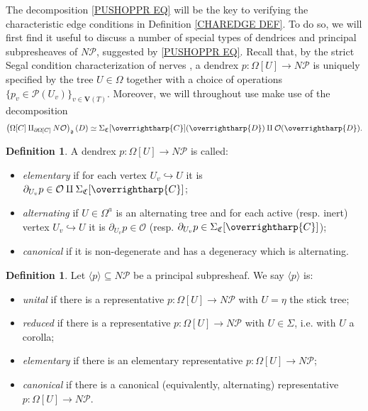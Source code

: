 \documentclass[a4paper,10pt]{article}%
\numberwithin{equation}{section}
\numberwithin{figure}{section}
\theoremstyle{definition} %
\newtheorem{definition}[equation]{Definition}%
\newcommand{\vect}[1]{\text{\overrightharp{\ensuremath{#1}}}}
\renewcommand{\O}{\ensuremath{\mathcal O}}
\newcommand{\1}{\ensuremath{\mathbbm 1}}%
\begin{document}
The decomposition \eqref{PUSHOPPR EQ}
will be the key to verifying the 
characteristic edge conditions in Definition \ref{CHAREDGE DEF}.
To do so, we will first find it useful to discuss a number of special types of dendrices and principal subpresheaves of $N \mathcal{P}$, suggested by \eqref{PUSHOPPR EQ}.
%
Recall that, by the strict Segal condition characterization of nerves \cite[Cor. 2.7]{CM13a},
a dendrex $p \colon \Omega[U] \to N \mathcal{P}$
is uniquely specified by the tree $U \in \Omega$ together with a choice of operations
$\{p_v \in \mathcal{P}(U_v)\}_{v \in \boldsymbol{V}(T)}$.
Moreover, we will throughout use make use of the decomposition 
\[
	\left(
	\Omega[C] \amalg_{\partial \Omega[C]} N \O
	\right)_{\mathfrak{d}} (D)
\simeq
	\Sigma_{\mathfrak{C}}[\vect{C}](\vect{D}) \amalg \O(\vect{D}).
\]


\begin{definition}
	A dendrex $p\colon \Omega[U] \to N \mathcal{P}$ 
	is called:
	\begin{itemize}
		\item \emph{elementary} if for each vertex $U_v \hookrightarrow U$
		it is $ \partial_{U_v} p \in \mathcal{O} \amalg \Sigma_{\mathfrak{C}}[\vect{C}]$; %
		\item \emph{alternating} if $U \in \Omega^a$ is an alternating tree
		and for each active (resp. inert) vertex 
		$U_v \hookrightarrow U$ it is
		$\partial_{U_v} p \in \O$
		(resp. $ \partial_{U_v} p \in \Sigma_{\mathfrak{C}}[\vect{C}]$);
		\item \emph{canonical} if it is non-degenerate and has a degeneracy which is alternating.
	\end{itemize}
\end{definition}


\begin{definition}
	Let $\langle p \rangle \subseteq N \mathcal{P}$ be 
	a principal subpresheaf. 
	We say $\langle p \rangle$ is:
	\begin{itemize}
		\item \emph{unital} if there is a representative
		$p\colon \Omega[U] \to N \mathcal{P}$ with $U=\eta$ the stick tree;
		\item \emph{reduced} if there is a representative
		$p\colon \Omega[U] \to N \mathcal{P}$ with $U \in \Sigma$, i.e. with $U$ a corolla;
		\item \emph{elementary} 
		if there is an elementary representative
		$p\colon \Omega[U] \to N \mathcal{P}$;
		\item \emph{canonical} 
		if there is a canonical (equivalently, alternating) representative
		$p\colon \Omega[U] \to N \mathcal{P}$.
	\end{itemize}
\end{definition}
\end{document}
